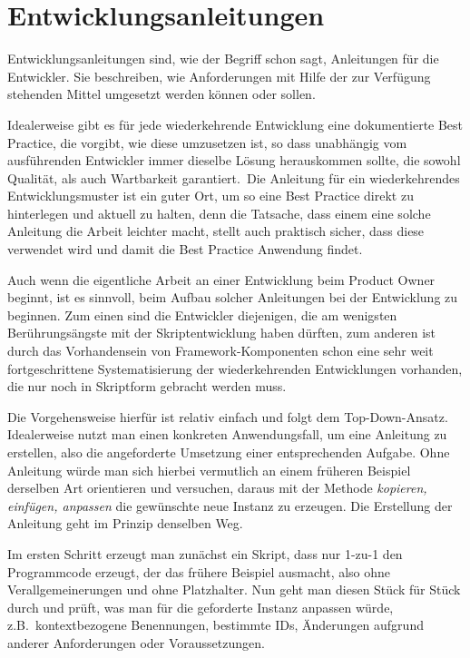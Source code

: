 \section{Entwicklungsanleitungen}\label{Entwicklungsanleitungen}
Entwicklungsanleitungen sind, wie der Begriff schon sagt, Anleitungen für die Entwickler. Sie beschreiben, wie Anforderungen mit Hilfe der zur Verfügung stehenden Mittel umgesetzt werden können oder sollen. 

Idealerweise gibt es für jede wiederkehrende Entwicklung eine dokumentierte Best Practice, die vorgibt, wie diese umzusetzen ist, so dass unabhängig vom ausführenden Entwickler immer dieselbe Lösung herauskommen sollte, die sowohl Qualität, als auch Wartbarkeit garantiert. Die Anleitung für ein wiederkehrendes Entwicklungsmuster ist ein guter Ort, um so eine Best Practice direkt zu hinterlegen und aktuell zu halten, denn die Tatsache, dass einem eine solche Anleitung die Arbeit leichter macht, stellt auch praktisch sicher, dass diese verwendet wird und damit die Best Practice Anwendung findet.

Auch wenn die eigentliche Arbeit an einer Entwicklung beim Product Owner beginnt, ist es sinnvoll, beim Aufbau solcher Anleitungen bei der Entwicklung zu beginnen. Zum einen sind die Entwickler diejenigen, die am wenigsten Berührungsängste mit der Skriptentwicklung haben dürften, zum anderen ist durch das Vorhandensein von Framework-Komponenten schon eine sehr weit fortgeschrittene Systematisierung der wiederkehrenden Entwicklungen vorhanden, die nur noch in Skriptform gebracht werden muss.

Die Vorgehensweise hierfür ist relativ einfach und folgt dem Top-Down-Ansatz. Idealerweise nutzt man einen konkreten Anwendungsfall, um eine Anleitung zu erstellen, also die angeforderte Umsetzung einer entsprechenden Aufgabe. Ohne Anleitung würde man sich hierbei vermutlich an einem früheren Beispiel derselben Art orientieren und versuchen, daraus mit der Methode \emph{kopieren, einfügen, anpassen} die gewünschte neue Instanz zu erzeugen. Die Erstellung der Anleitung geht im Prinzip denselben Weg.

Im ersten Schritt erzeugt man zunächst ein Skript, dass nur 1-zu-1 den Programmcode erzeugt, der das frühere Beispiel ausmacht, also ohne Verallgemeinerungen und ohne Platzhalter. Nun geht man diesen Stück für Stück durch und prüft, was man für die geforderte Instanz anpassen würde, z.B.\ kontextbezogene Benennungen, bestimmte IDs, Änderungen aufgrund anderer Anforderungen oder Voraussetzungen.

